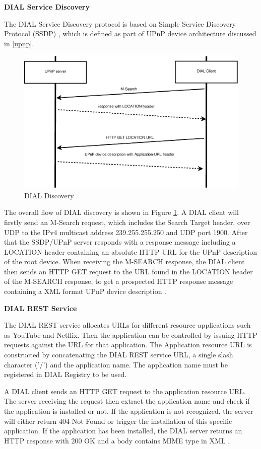 \textbf{DIAL Service Discovery}

The DIAL Service Discovery protocol is based on Simple Service Discovery 
Protocol (SSDP) \cite{ssdp_rfc}, which is defined as part of UPnP device
architecture discussed in \ref{upnp}.

\begin{figure}[htb] \centering 
\includegraphics[width=0.95\columnwidth]{charts/dial_discovery} 
\caption{DIAL Discovery \label{dial_discovery}} 
\end{figure} 

The overall flow of DIAL discovery is shown in Figure \ref{dial_discovery}. A
DIAL client will firstly send an M-Search request, which includes  the Search
Target header, over UDP to the IPv4 multicast address 239.255.255.250 and UDP
port 1900. After that the SSDP/UPnP server responds with a response message
including a LOCATION header containing an absolute HTTP URL for the UPnP
description of the root device. When receiving the M-SEARCH response, the DIAL
client then sends an HTTP GET request to the URL found in the LOCATION header
of the M-SEARCH response, to get a prospected HTTP response message containing
a XML format UPnP device description \cite{dial}. 

\textbf{DIAL REST Service}

The DIAL REST service allocates URLs for different resource applications such as 
YouTube and Netflix. Then the application can be controlled by issuing HTTP 
requests against the URL for that application. The Application resource URL is 
constructed by concatenating the DIAL REST service URL, a single slash character 
('/') and the application name. The application name must be registered in DIAL 
Registry to be used.

A DIAL client sends an HTTP GET request to the application resource URL. 
The server receiving the request then extract the application name and check if the 
application is installed or not. If the application is not recognized, the 
server will either return 404 Not Found or trigger the installation of this specific 
application. If the application has been installed, the DIAL server returns 
an HTTP response with 200 OK and a body contains MIME type in XML \cite{dial}.

